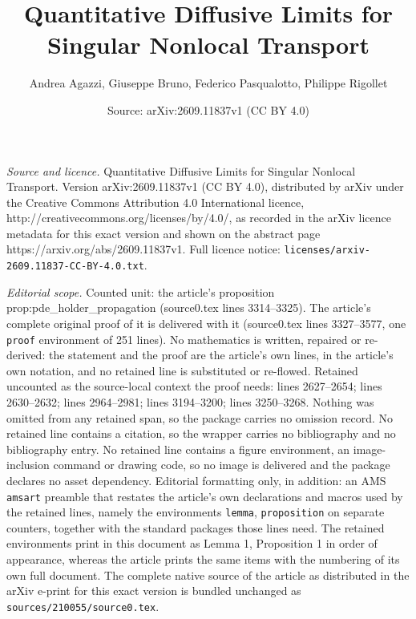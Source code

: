 \documentclass[10pt,a4paper]{amsart}
\title{\vspace{-1cm} Quantitative Diffusive Limits for Singular Nonlocal Transport}
\author{Andrea Agazzi, Giuseppe Bruno, Federico Pasqualotto, Philippe Rigollet}
\date{Source: arXiv:2609.11837v1 (CC BY 4.0)}
\begin{document}
\maketitle

\noindent\emph{Source and licence.} \vspace{-1cm} Quantitative Diffusive Limits for Singular Nonlocal Transport. Version arXiv:2609.11837v1 (CC BY 4.0), distributed by arXiv under the Creative Commons Attribution 4.0 International licence, http://creativecommons.org/licenses/by/4.0/, as recorded in the arXiv licence metadata for this exact version and shown on the abstract page https://arxiv.org/abs/2609.11837v1. Full licence notice: \texttt{licenses/arxiv-2609.11837-CC-BY-4.0.txt}.\par\smallskip

\noindent\textit{Editorial scope.} Counted unit: the article's proposition prop:pde\_holder\_propagation (source0.tex lines 3314--3325). The article's complete original proof of it is delivered with it (source0.tex lines 3327--3577, one \texttt{proof} environment of 251 lines). No mathematics is written, repaired or re-derived: the statement and the proof are the article's own lines, in the article's own notation, and no retained line is substituted or re-flowed.  Retained uncounted as the source-local context the proof needs: lines 2627--2654; lines 2630--2632; lines 2964--2981; lines 3194--3200; lines 3250--3268.  Nothing was omitted from any retained span, so the package carries no omission record.  No retained line contains a citation, so the wrapper carries no bibliography and no bibliography entry.  No retained line contains a figure environment, an image-inclusion command or drawing code, so no image is delivered and the package declares no asset dependency.  Editorial formatting only, in addition: an AMS \texttt{amsart} preamble that restates the article's own declarations and macros used by the retained lines, namely the environments \texttt{lemma}, \texttt{proposition} on separate counters, together with the standard packages those lines need.  The retained environments print in this document as Lemma 1, Proposition 1 in order of appearance, whereas the article prints the same items with the numbering of its own full document.  The complete native source of the article as distributed in the arXiv e-print for this exact version is bundled unchanged as \texttt{sources/210055/source0.tex}.
\end{document}
